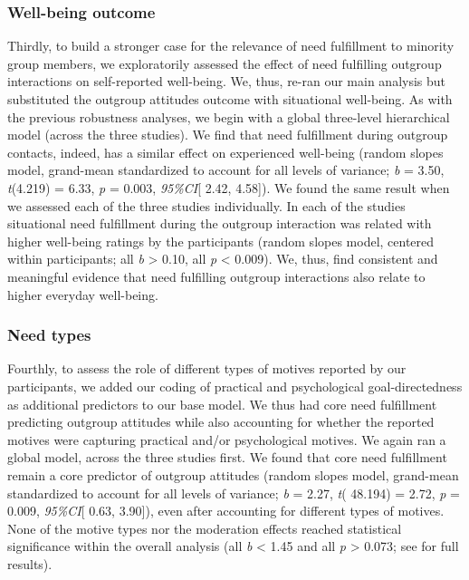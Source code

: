 \subsubsection{Well-being outcome}

Thirdly, to build a stronger case for the relevance of need fulfillment
to minority group members, we exploratorily assessed the effect of need
fulfilling outgroup interactions on self-reported well-being. We, thus,
re-ran our main analysis but substituted the outgroup attitudes outcome
with situational well-being. As with the previous robustness analyses,
we begin with a global three-level hierarchical model (across the three
studies). We find that need fulfillment during outgroup contacts,
indeed, has a similar effect on experienced well-being (random slopes
model, grand-mean standardized to account for all levels of variance;
\textit{b} = 3.50, \textit{t}(4.219) = 6.33, \textit{p} = 0.003,
\textit{95\%CI}{[} 2.42, 4.58{]}). We found the same result when we
assessed each of the three studies individually. In each of the studies
situational need fulfillment during the outgroup interaction was related
with higher well-being ratings by the participants (random slopes model,
centered within participants; all \textbar{}\textit{b}\textbar{}
\textgreater{} 0.10, all \textit{p} \textless{} 0.009). We, thus, find
consistent and meaningful evidence that need fulfilling outgroup
interactions also relate to higher everyday well-being.

\subsubsection{Need types}

Fourthly, to assess the role of different types of motives reported by
our participants, we added our coding of practical and psychological
goal-directedness as additional predictors to our base model. We thus
had core need fulfillment predicting outgroup attitudes while also
accounting for whether the reported motives were capturing practical
and/or psychological motives. We again ran a global model, across the
three studies first. We found that core need fulfillment remain a core
predictor of outgroup attitudes (random slopes model, grand-mean
standardized to account for all levels of variance; \textit{b} = 2.27,
\textit{t}( 48.194) = 2.72, \textit{p} = 0.009, \textit{95\%CI}{[} 0.63,
3.90{]}), even after accounting for different types of motives. None of
the motive types nor the moderation effects reached statistical
significance within the overall analysis (all
\textbar{}\textit{b}\textbar{} \textless{} 1.45 and all \textit{p}
\textgreater{} 0.073; see  for full
results).

